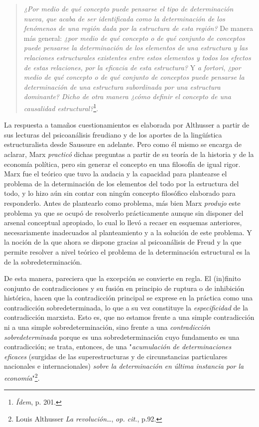 \begin{quote}
\emph{¿Por medio de qué concepto puede pensarse el tipo de determinación
nueva, que acaba de ser identificada como la determinación de los
fenómenos de una región dada por la estructura de esta región?} De
manera más general: \emph{¿por medio de qué concepto o de qué conjunto
de conceptos puede pensarse la determinación de los elementos de una
estructura y las relaciones estructurales existentes entre estos
elementos y todos los efectos de estas relaciones, por la eficacia de
esta estructura?} Y \emph{a fortori}, \emph{¿por medio de qué concepto o
de qué conjunto de conceptos puede pensarse la determinación de una
estructura subordinada por una estructura dominante? Dicho de otra
manera ¿cómo definir el concepto de una causalidad
estructural?}\footnote{\emph{Ídem}, p. 201.}.
\end{quote}

La respuesta a tamaños cuestionamientos es elaborada por Althusser a
partir de sus lecturas del psicoanálisis freudiano y de los aportes de
la lingüística estructuralista desde Saussure en adelante. Pero como él
mismo se encarga de aclarar, Marx \emph{practicó} dichas preguntas a
partir de su teoría de la historia y de la economía política, pero sin
generar el concepto en una filosofía de igual rigor. Marx fue el teórico
que tuvo la audacia y la capacidad para plantearse el problema de la
determinación de los elementos del todo por la estructura del todo, y lo
hizo aún sin contar con ningún concepto filosófico elaborado para
responderlo. Antes de plantearlo como problema, más bien Marx
\emph{produjo} este problema ya que se ocupó de resolverlo prácticamente
aunque sin disponer del arsenal conceptual apropiado, lo cual lo llevó a
recaer en esquemas anteriores, necesariamente inadecuados al
planteamiento y a la solución de este problema. Y la noción de la que
ahora se dispone gracias al psicoanálisis de Freud y la que permite
resolver a nivel teórico el problema de la determinación estructural es
la de la sobredeterminación.

De esta manera, pareciera que la excepción se convierte en regla. El
(in)finito conjunto de contradicciones y su fusión en principio de
ruptura o de inhibición histórica, hacen que la contradicción principal
se exprese en la práctica como una contradicción sobredeterminada, lo
que a su vez constituye la \emph{especificidad} de la contradicción
marxista. Esto es, que no estamos frente a una simple contradicción ni a
una simple sobredeterminación, sino frente a una \emph{contradicción
sobredeterminada} porque es una sobredeterminación cuyo fundamento es
una contradicción; se trata, entonces, de una "\emph{acumulación de
determinaciones eficaces} (surgidas de las superestructuras y de
circunstancias particulares nacionales e internacionales) \emph{sobre la
determinación en última instancia por la economía}"\footnote{Louis
  Althusser \emph{La revolución}\ldots, \emph{op. cit.}, p.92.}.

